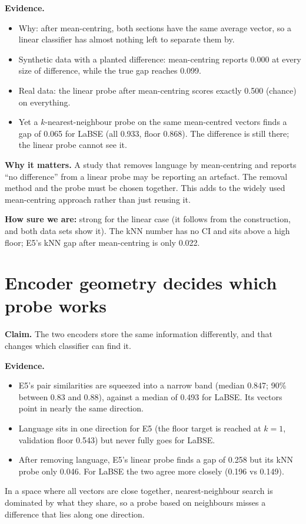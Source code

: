\documentclass[11pt,a4paper]{article}
\newcommand{\strength}[1]{\par\noindent\textbf{How sure we are:} #1\par}
\newcommand{\claim}[1]{\par\smallskip\noindent\colorbox{black!6}{\parbox{\dimexpr\linewidth-2\fboxsep}{\textbf{Claim.} #1}}\par\smallskip}
\begin{document}
\textbf{Evidence.}
\begin{itemize}
  \item Why: after mean-centring, both sections have the same average vector, so a linear classifier has
  almost nothing left to separate them by.
  \item Synthetic data with a planted difference: mean-centring reports 0.000 at every size of
  difference, while the true gap reaches 0.099.
  \item Real data: the linear probe after mean-centring scores exactly 0.500 (chance) on everything.
  \item Yet a $k$-nearest-neighbour probe on the same mean-centred vectors finds a gap of 0.065 for LaBSE
  (all 0.933, floor 0.868). The difference is still there; the linear probe cannot see it.
\end{itemize}

\textbf{Why it matters.} A study that removes language by mean-centring and reports ``no difference''
from a linear probe may be reporting an artefact. The removal method and the probe must be chosen
together. This adds to the widely used mean-centring approach rather than just reusing it.

\strength{strong for the linear case (it follows from the construction, and both data sets show it). The
kNN number has no CI and sits above a high floor; E5's kNN gap after mean-centring is only 0.022.}

\section{Encoder geometry decides which probe works}
\claim{The two encoders store the same information differently, and that changes which classifier can
find it.}

\textbf{Evidence.}
\begin{itemize}
  \item E5's pair similarities are squeezed into a narrow band (median 0.847; 90\% between 0.83
  and 0.88), against a median of 0.493 for LaBSE. Its vectors point in nearly the same direction.
  \item Language sits in one direction for E5 (the floor target is reached at $k{=}1$, validation floor
  0.543) but never fully goes for LaBSE.
  \item After removing language, E5's linear probe finds a gap of 0.258 but its kNN probe only 0.046.
  For LaBSE the two agree more closely (0.196 vs 0.149).
\end{itemize}
In a space where all vectors are close together, nearest-neighbour search is dominated by what they
share, so a probe based on neighbours misses a difference that lies along one direction.
\end{document}
